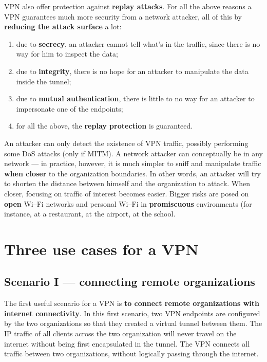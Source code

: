\documentclass[10pt]{extreport}
\begin{document}
VPN also offer protection against \textbf{replay attacks}. For all the above
reasons a VPN guarantees much more security from a network attacker, all of
this by \textbf{reducing the attack surface} a lot:
\begin{enumerate}
    \item due to \textbf{secrecy}, an attacker cannot tell what's in the
        traffic, since there is no way for him to inspect the data;
    \item due to \textbf{integrity}, there is no hope for an attacker to
        manipulate the data inside the tunnel;
    \item due to \textbf{mutual authentication}, there is little to no way for
        an attacker to impersonate one of the endpoints;
    \item for all the above, the \textbf{replay protection} is guaranteed.
\end{enumerate}

An attacker can only detect the existence of VPN traffic, possibly performing
some DoS attacks (only if MITM). A network attacker can conceptually be in any
network --- in practice, however, it is much simpler to sniff and manipulate
traffic \textbf{when closer} to the organization boundaries. In other words, an
attacker will try to shorten the distance between himself and the organization
to attack. When closer, focusing on traffic of interest becomes easier. Bigger
risks are posed on \textbf{open} Wi--Fi networks and personal Wi--Fi in
\textbf{promiscuous} environments (for instance, at a restaurant, at the
airport, at the school.



\section{Three use cases for a VPN}
\subsection{Scenario I --- connecting remote organizations}

The first useful scenario for a VPN is \textbf{to connect remote organizations
with internet connectivity}. In this first scenario, two VPN endpoints are
configured by the two organizations so that they created a virtual tunnel
between them. The IP traffic of all clients across the two organization will
never travel on the internet without being first encapsulated in the tunnel.
The VPN connects all traffic between two organizations, without logically
passing through the internet.
\end{document}
